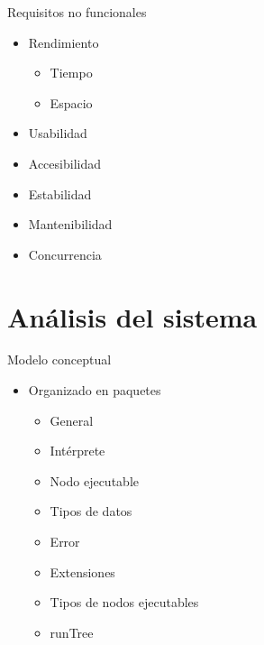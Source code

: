 \documentclass[spanish]{beamer}
\begin{document}
\begin{frame}{Requisitos no funcionales}
    \begin{itemize}
      \item Rendimiento 
      \begin{itemize}
      \item Tiempo
      \item Espacio
      \end {itemize}
      \item Usabilidad
      \item Accesibilidad
      \item Estabilidad
      \item Mantenibilidad
      \item Concurrencia
   \end{itemize}
\end{frame}

\section{Análisis del sistema}
\begin{frame}{Modelo conceptual}
    \begin{itemize}
      \item Organizado en paquetes
      \begin{itemize}
      \item General
      \item Intérprete
      \item Nodo ejecutable
      \item Tipos de datos
      \item Error
      \item Extensiones
      \item Tipos de nodos ejecutables
      \item runTree
      \end {itemize}
   \end{itemize}
\end{frame}
\end{document}
